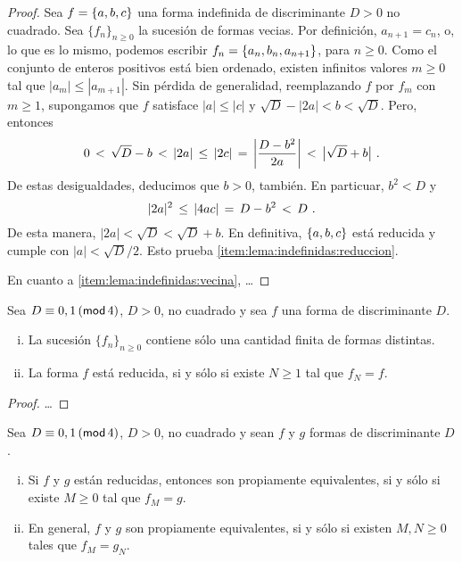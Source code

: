 \begin{proof}
	Sea $f=\binaria{a,b,c}$ una forma indefinida de discriminante $D>0$
	no cuadrado.
	Sea $\{f_n\}_{n\geq 0}$ la sucesi\'on de formas vecias.
	Por definici\'on, $a_{n+1}=c_n$, o, lo que es lo mismo,
	podemos escribir $f_n=\binaria{a_n,b_n,a_{n+1}}$, para $n\geq 0$.
	Como el conjunto de enteros positivos est\'a bien ordenado,
	existen infinitos valores $m\geq 0$ tal que $|a_m|\leq |a_{m+1}|$.
	Sin p\'erdida de generalidad, reemplazando $f$ por $f_m$
	con $m\geq 1$, supongamos que $f$ satisface $|a|\leq |c|$ y
	$\sqrt D-|2a|<b<\sqrt D$. Pero, entonces
	\begin{displaymath}
		0\,<\,\sqrt D-b\,<\,|2a|\,\leq\,|2c|\,=\,
			\bigg|\frac{D-b^2}{2a}\bigg|\,<\,\big|\sqrt D+b\big|
		\dispstop
	\end{displaymath}
	De estas desigualdades, deducimos que $b>0$, tambi\'en.
	En particuar, $b^2<D$ y
	\begin{displaymath}
		|2a|^2\,\leq\,|4ac|\,=\,D-b^2\,<\,D
		\dispstop
	\end{displaymath}
	De esta manera, $|2a|<\sqrt D<\sqrt D+b$.
	En definitiva, $\binaria{a,b,c}$ est\'a reducida y cumple con
	$|a|<\sqrt D/2$. Esto prueba \eqref{item:lema:indefinidas:reduccion}.

	En cuanto a \eqref{item:lema:indefinidas:vecina}, \dots
\end{proof}

\begin{teoIndefinidas}\label{teo:indefinidas:reducida}
	Sea $D\equiv 0,1\tmodulo[4]$, $D>0$, no cuadrado y sea $f$ una
	forma de discriminante $D$.
	\begin{enumerate}[(i)]
		\item\label{item:teo:indefinidas:estabiliza}
			La sucesi\'on $\{f_n\}_{n\geq 0}$ contiene s\'olo
			una cantidad finita de formas distintas.
		\item\label{item:teo:indefinidas:reducida}
			La forma $f$ est\'a reducida,
			si y s\'olo si existe $N\geq 1$ tal que $f_N=f$.
	\end{enumerate}
\end{teoIndefinidas}

\begin{proof}
	\dots
\end{proof}

\begin{teoIndefinidas}\label{teo:indefinidas:comparacion}
	Sea $D\equiv 0,1\tmodulo[4]$, $D>0$, no cuadrado y
	sean $f$ y $g$ formas de discriminante $D$.
	\begin{enumerate}[(i)]
		\item\label{item:teo:indefinidas:comparacion:reducidas}
			Si $f$ y $g$ est\'an reducidas, entonces
			son propiamente equivalentes, si y s\'olo si
			existe $M\geq 0$ tal que $f_M=g$.
		\item\label{item:teo:indefinidas:comparacion}
			En general, $f$ y $g$ son propiamente equivalentes,
			si y s\'olo si existen $M,N\geq 0$ tales que
			$f_M=g_N$.
	\end{enumerate}
\end{teoIndefinidas}


